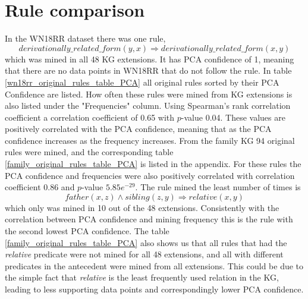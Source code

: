 \newpage
\section{Rule comparison}
In the WN18RR dataset there was one rule, 
\[derivationally\_related\_form(y, x) \Rightarrow derivationally\_related\_form(x, y)\]
which was mined in all 48 KG extensions. It has PCA confidence of 1, meaning that there are no data points in WN18RR that do not follow the rule. In table \ref{wn18rr_original_rules_table_PCA} all original rules sorted by their PCA Confidence are listed. How often these rules were mined from KG extensions is also listed under the "Frequencies" column. Using Spearman's rank correlation coefficient a correlation coefficient of 0.65 with $p$-value 0.04. These values are positively correlated with the PCA confidence, meaning that as the PCA confidence increases as the frequency increases. From the family KG 94 original rules were mined, and the corresponding table \ref{family_original_rules_table_PCA} is listed in the appendix. For these rules the PCA confidence and frequencies were also positively correlated with correlation coefficient 0.86 and $p$-value $5.85e^{-29}$. The rule mined the least number of times is
\[father(x,z) \wedge sibling(z, y) \Rightarrow relative(x, y)\]
which only was mined in 10 out of the 48 extensions. Consistently with the correlation between PCA confidence and mining frequency this is the rule with the second lowest PCA confidence. The table \ref{family_original_rules_table_PCA} also shows us that all rules that had the \textit{relative} predicate were not mined for all 48 extensions, and all with different predicates in the antecedent were mined from all extensions. This could be due to the simple fact that \textit{relative} is the least frequently used relation in the KG, leading to less supporting data points and correspondingly lower PCA confidence.



